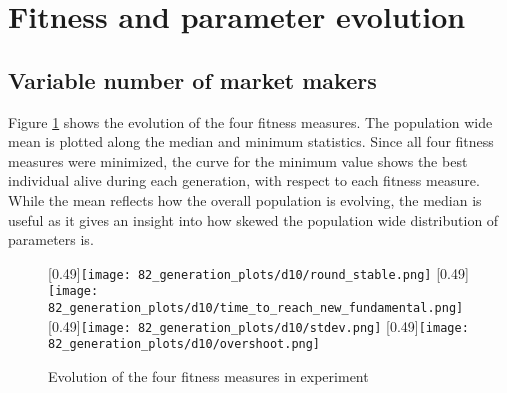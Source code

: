 \section{Fitness and parameter evolution}\label{section:fitness_and_paraeter_evolution}


\subsection{Variable number of market makers}

Figure \ref{fig:d10_evolution_fitness} shows the evolution of the four fitness measures. The population wide mean is plotted along the median and minimum statistics. Since all four fitness measures were minimized, the curve for the minimum value shows the best individual alive during each generation, with respect to each fitness measure. While the mean reflects how the overall population is evolving,  the median is useful as it gives an insight into how skewed the population wide distribution of parameters is. 


\begin{figure}
	\centering
	\vspace{0.5cm}
	[0.49\linewidth]{\texttt{[image: 82\_generation\_plots/d10/round\_stable.png]}}
	[0.49\linewidth]{\texttt{[image: 82\_generation\_plots/d10/time\_to\_reach\_new\_fundamental.png]}}
	\vspace{0.5cm}
	[0.49\linewidth]{\texttt{[image: 82\_generation\_plots/d10/stdev.png]}}
	[0.49\linewidth]{\texttt{[image: 82\_generation\_plots/d10/overshoot.png]}}
	\caption{Evolution of the four fitness measures in experiment \dten}
	\label{fig:d10_evolution_fitness}
\end{figure}





